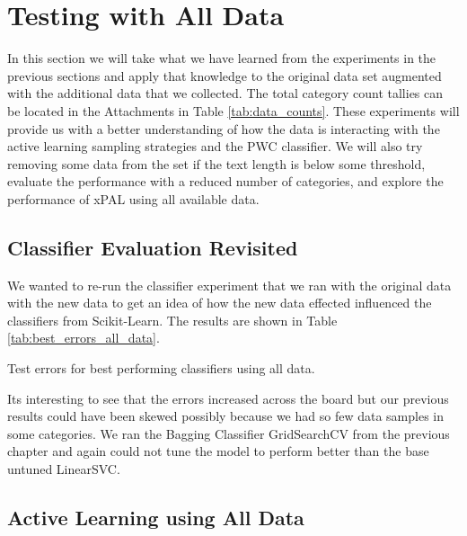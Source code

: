 \chapter{Testing with All Data}
\label{sec:proper_vectorization}

In this section we will take what we have learned from the experiments in the previous sections and apply that knowledge to the original data set augmented with the additional data that we collected. The total category count tallies can be located in the Attachments in Table \ref{tab:data_counts}. These experiments will provide us with a better understanding of how the data is interacting with the active learning sampling strategies and the PWC classifier. We will also try removing some data from the set if the text length is below some threshold, evaluate the performance with a reduced number of categories, and explore the performance of xPAL using all available data.

\section{Classifier Evaluation Revisited}

We wanted to re-run the classifier experiment that we ran with the original data with the new data to get an idea of how the new data effected influenced the classifiers from Scikit-Learn. The results are shown in Table \ref{tab:best_errors_all_data}.

\begin{table}[ht]
    \centering
    \caption{Test errors for best performing classifiers using all data.}
    
    \label{tab:best_errors_all_data}
\end{table}

Its interesting to see that the errors increased across the board but our previous results could have been skewed possibly because we had so few data samples in some categories. We ran the Bagging Classifier GridSearchCV from the previous chapter and again could not tune the model to perform better than the base untuned LinearSVC.

\section{Active Learning using All Data}

